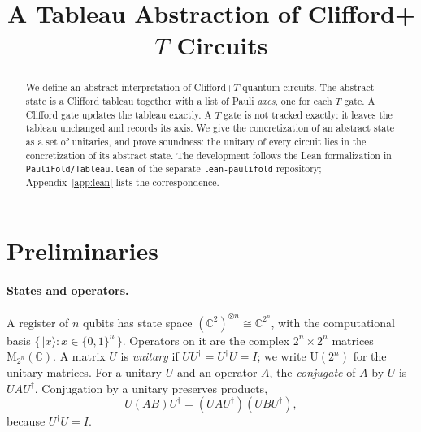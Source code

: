 \documentclass[11pt]{article}
\title{A Tableau Abstraction of Clifford+$T$ Circuits}
\author{}
\date{}
\theoremstyle{definition}
\theoremstyle{remark}
\newcommand{\C}{\mathbb{C}}
\newcommand{\Mat}{\mathrm{M}_{2^n}(\C)}
\newcommand{\Unit}{\mathrm{U}(2^n)}
\newcommand{\adj}{^{\dagger}}
\begin{document}
\maketitle

\begin{abstract}
We define an abstract interpretation of Clifford+$T$ quantum circuits. The abstract state
is a Clifford tableau together with a list of Pauli \emph{axes}, one for each $T$ gate. A
Clifford gate updates the tableau exactly. A $T$ gate is not tracked exactly: it leaves the
tableau unchanged and records its axis. We give the concretization of an abstract state as
a set of unitaries, and prove soundness: the unitary of every circuit lies in the
concretization of its abstract state. The development follows the Lean formalization in
\texttt{PauliFold/Tableau.lean} of the separate \texttt{lean-paulifold} repository;
Appendix~\ref{app:lean} lists the correspondence.
\end{abstract}

\section{Preliminaries}

\paragraph{States and operators.}
A register of $n$ qubits has state space $(\C^2)^{\otimes n} \cong \C^{2^n}$, with the
computational basis $\{\,|x\rangle : x \in \{0,1\}^n\,\}$. Operators on it are the complex
$2^n \times 2^n$ matrices $\Mat$. A matrix $U$ is \emph{unitary} if
$U U\adj = U\adj U = I$; we write $\Unit$ for the unitary matrices. For a unitary $U$ and
an operator $A$, the \emph{conjugate} of $A$ by $U$ is $U A U\adj$. Conjugation by a unitary
preserves products,
\begin{equation}\label{eq:conj-mult}
  U (AB) U\adj = (U A U\adj)(U B U\adj),
\end{equation}
because $U\adj U = I$.
\end{document}
